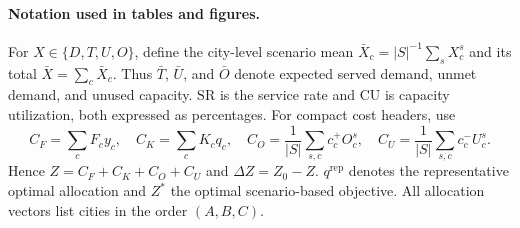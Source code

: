 \documentclass[10pt,a4paper]{article}
\begin{document}
\paragraph{Notation used in tables and figures.}
For $X\in\{D,T,U,O\}$, define the city-level scenario mean
$\bar X_c=|S|^{-1}\sum_sX_c^s$ and its total $\bar X=\sum_c\bar X_c$.
Thus $\bar T$, $\bar U$, and $\bar O$ denote expected served demand, unmet demand, and unused capacity.
$\mathrm{SR}$ is the service rate and $\mathrm{CU}$ is capacity utilization, both expressed as percentages.
For compact cost headers, use
\[
C_F=\sum_cF_cy_c,\quad C_K=\sum_cK_cq_c,\quad
C_O=\frac{1}{|S|}\sum_{s,c}c_c^+O_c^s,\quad
C_U=\frac{1}{|S|}\sum_{s,c}c_c^-U_c^s.
\]
Hence $Z=C_F+C_K+C_O+C_U$ and $\Delta Z=Z_0-Z$.
$q^{\mathrm{rep}}$ denotes the representative optimal allocation and $Z^*$ the optimal scenario-based objective.
All allocation vectors list cities in the order $(A,B,C)$.
\end{document}
